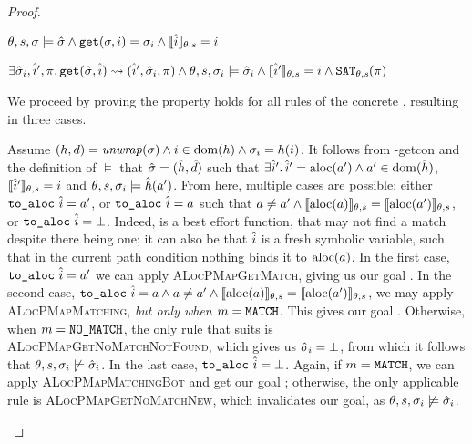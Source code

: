 \begin{proof}


\pfassume \begin{hypvlist}
 $\theta,s,\sigma \models \hat{\sigma} \land \texttt{get}(\sigma, i)=\sigma_i \land \llbracket\hat{i}\rrbracket_{\theta,s}=i$
\end{hypvlist}
\pfprove \begin{goalvlist}
 $\exists \hat{\sigma}_i, \hat{i}', \pi \ldotp \texttt{get}(\hat{\sigma},\hat{i})\rightsquigarrow(\hat{i}', \hat{\sigma}_i, \pi) \land \theta,s,\sigma_i\models\hat{\sigma}_i \land \llbracket\hat{i}'\rrbracket_{\theta,s}=i \land \texttt{SAT}_{\mathit{\theta,s}}(\pi)$
\end{goalvlist}

We proceed by proving the property holds for all rules of the concrete , resulting in three cases.


\begin{hypvlist}
 Assume $(h,d)={\operatorname{\mathit{unwrap}}}(\sigma) \land i\in\operatorname{dom}(h) \land \sigma_{i}=h(i)$.
 It follows from \hyp{getcon} and the definition of $\models$ that $\hat{\sigma}=(\hat{h}, \hat{d})$ such that $\exists \hat{i}'\ldotp \hat{i}' = \text{aloc}(a') \land a' \in \operatorname{dom}(\hat{h})$, $\llbracket\hat{i}'\rrbracket_{\theta,s}=i$ and $\theta,s,\sigma_i\models \hat{h}(a')$.
 From here, multiple cases are possible: either $\texttt{to\_aloc}~\hat{i}=a'$, or $\texttt{to\_aloc}~\hat{i}=a$ such that $a\neq a'\land \llbracket\text{aloc}(a)\rrbracket_{\theta,s}=\llbracket\text{aloc}(a')\rrbracket_{\theta,s}$, or $\texttt{to\_aloc}~\hat{i}=\bot$. Indeed,  is a best effort function, that may not find a match despite there being one; it can also be that $\hat{i}$ is a fresh symbolic variable, such that in the current path condition nothing binds it to $\text{aloc}(a)$.
 In the first case, $\texttt{to\_aloc}~\hat{i}=a'$ we can apply \textsc{ALocPMapGetMatch}, giving us our goal .
 In the second case, $\texttt{to\_aloc}~\hat{i}=a\land a\neq a'\land \llbracket\text{aloc}(a)\rrbracket_{\theta,s}=\llbracket\text{aloc}(a')\rrbracket_{\theta,s}$, we may apply \textsc{ALocPMapMatching}, \emph{but only when $m=\texttt{MATCH}$}. This gives our goal . {\color{red}Otherwise, when $m=\texttt{NO\_MATCH}$, the only rule that suits is \textsc{ALocPMapGetNoMatchNotFound}, which gives us $\hat{\sigma}_i=\bot$, from which it follows that $\theta,s,\sigma_i\not\models\hat{\sigma}_i$.}
 In the last case, $\texttt{to\_aloc}~\hat{i}=\bot$. Again, if $m=\texttt{MATCH}$, we can apply \textsc{ALocPMapMatchingBot} and get our goal ; {\color{red}otherwise, the only applicable rule is \textsc{ALocPMapGetNoMatchNew}, which invalidates our goal, as $\theta,s,\sigma_i\not\models\hat{\sigma}_i$.}
\end{hypvlist}


\end{proof}
